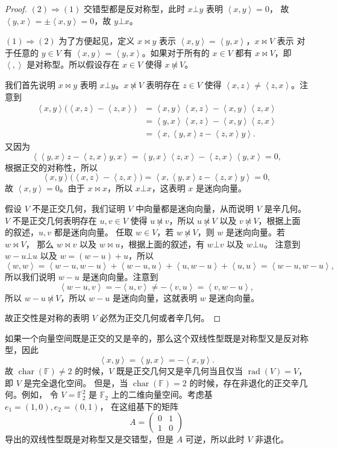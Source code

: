 \documentclass[fontset=none,zihao=-4]{Notes}
\DeclareMathOperator\cha{char}
\DeclareMathOperator\rad{rad}
\newcommand{\inn}[1]{\left\langle#1\right\rangle}
\begin{document}
\begin{proof}
  $(2)\Rightarrow (1)$ 交错型都是反对称型，此时 $x\bot y$ 表明 $\inn{x,y}=0$，
  故 $\inn{y,x}=\pm\inn{x,y}=0$，故 $y\bot x$。

  $(1)\Rightarrow (2)$ 为了方便起见，定义
  $x\bowtie y$ 表示 $\inn{x,y}=\inn{y,x}$，$x\bowtie V$ 表示
  对于任意的 $y\in V$ 有 $\inn{x,y}=\inn{y,x}$。如果对于所有的 $x\in V$
  都有 $x\bowtie V$，即 $\inn{,}$ 是对称型。所以假设存在 $x\in V$ 使得
  $x\not\bowtie V$。

  我们首先说明 $x\bowtie y$ 表明 $x\bot y$。$x\not\bowtie V$ 表明存在 $z\in V$
  使得 $\inn{x,z}\neq\inn{z,x}$。注意到
  \begin{align*}
    \inn{x,y}\bigl(\inn{x,z}-\inn{z,x}\bigr)&=\inn{x,y}\inn{x,z}-\inn{x,y}\inn{z,x}\\
    &=\inn{y,x}\inn{x,z}-\inn{x,y}\inn{z,x}\\
    &=\inn{x,\inn{y,x}z-\inn{z,x}y}.
  \end{align*}
  又因为
  \[
    \inn{\inn{y,x}z-\inn{z,x}y,x}=\inn{y,x}\inn{z,x}-\inn{z,x}\inn{y,x}=0,
  \]
  根据正交的对称性，所以 
  \[
    \inn{x,y}\bigl(\inn{x,z}-\inn{z,x}\bigr)=  \inn{x,\inn{y,x}z-\inn{z,x}y}=0,
  \]
  故 $\inn{x,y}=0$。由于 $x\bowtie x$，所以 $x\bot x$，这表明 $x$ 是迷向向量。

  假设 $V$ 不是正交几何，我们证明 $V$ 中向量都是迷向向量，从而说明 $V$ 是辛几何。
  $V$ 不是正交几何表明存在 $u,v\in V$ 使得 $u\not\bowtie v$，所以 $u\not\bowtie V$
  以及 $v\not\bowtie V$，根据上面的叙述，$u,v$ 都是迷向向量。
  任取 $w\in V$，若 $w\not\bowtie V$，则 $w$ 是迷向向量。若 $w\bowtie V$，
  那么 $w\bowtie v$ 以及 $w\bowtie u$，根据上面的叙述，有 $w\bot v$ 以及 $w\bot u$。
  注意到 $w-u\bot u$ 以及 $w=(w-u)+u$，所以
  \[
    \inn{w,w}=\inn{w-u,w-u}+\inn{w-u,u}+\inn{u,w-u}+\inn{u,u}=
    \inn{w-u,w-u},  
  \]
  所以我们说明 $w-u$ 是迷向向量。注意到
  \[
    \inn{w-u,v}=-\inn{u,v}\neq-\inn{v,u}=\inn{v,w-u},  
  \]
  所以 $w-u\not\bowtie V$，所以 $w-u$ 是迷向向量，这就表明 $w$ 是迷向向量。

  故正交性是对称的表明 $V$ 必然为正交几何或者辛几何。
\end{proof}

如果一个向量空间既是正交的又是辛的，那么这个双线性型既是对称型又是反对称型，因此
\[
  \inn{x,y}=\inn{y,x}=-\inn{x,y}.
\]
故 $\cha(\mathbb{F})\neq 2$ 的时候，$V$ 既是正交几何又是辛几何当且仅当
$\rad(V)=V$，即 $V$ 是完全退化空间。
但是，当 $\cha(\mathbb{F})=2$ 的时候，存在非退化的正交辛几何。例如，
令 $V=\mathbb{F}_2^2$ 是 $\mathbb{F}_2$ 上的二维向量空间。考虑基 $e_1=(1,0),e_2=(0,1)$，
在这组基下的矩阵
\[
  A=\begin{pmatrix}
    0 & 1 \\
    1 & 0
  \end{pmatrix}  
\]
导出的双线性型既是对称型又是交错型，但是 $A$ 可逆，所以此时 $V$ 非退化。
\end{document}
